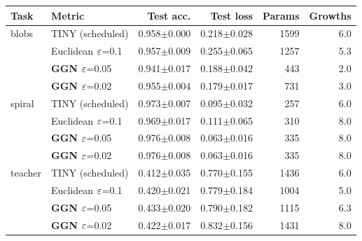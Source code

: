 \begin{tabular}{llrrrr}
\toprule
Task & Metric & Test acc. & Test loss & Params & Growths \\
\midrule
blobs & TINY (scheduled) & 0.958$\pm$0.000 & 0.218$\pm$0.028 & 1599 & 6.0 \\
 & Euclidean $\varepsilon$=0.1 & 0.957$\pm$0.009 & 0.255$\pm$0.065 & 1257 & 5.3 \\
 & \textbf{GGN} $\varepsilon$=0.05 & 0.941$\pm$0.017 & 0.188$\pm$0.042 & 443 & 2.0 \\
 & \textbf{GGN} $\varepsilon$=0.02 & 0.955$\pm$0.004 & 0.179$\pm$0.017 & 731 & 3.0 \\
\midrule
spiral & TINY (scheduled) & 0.973$\pm$0.007 & 0.095$\pm$0.032 & 257 & 6.0 \\
 & Euclidean $\varepsilon$=0.1 & 0.969$\pm$0.017 & 0.111$\pm$0.065 & 310 & 8.0 \\
 & \textbf{GGN} $\varepsilon$=0.05 & 0.976$\pm$0.008 & 0.063$\pm$0.016 & 335 & 8.0 \\
 & \textbf{GGN} $\varepsilon$=0.02 & 0.976$\pm$0.008 & 0.063$\pm$0.016 & 335 & 8.0 \\
\midrule
teacher & TINY (scheduled) & 0.412$\pm$0.035 & 0.770$\pm$0.155 & 1436 & 6.0 \\
 & Euclidean $\varepsilon$=0.1 & 0.420$\pm$0.021 & 0.779$\pm$0.184 & 1004 & 5.0 \\
 & \textbf{GGN} $\varepsilon$=0.05 & 0.433$\pm$0.020 & 0.790$\pm$0.182 & 1115 & 6.3 \\
 & \textbf{GGN} $\varepsilon$=0.02 & 0.422$\pm$0.017 & 0.832$\pm$0.156 & 1431 & 8.0 \\
\bottomrule
\end{tabular}